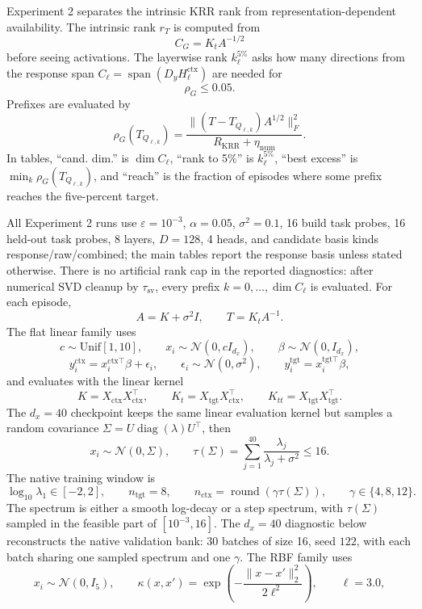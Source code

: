 \documentclass[11pt]{article}
\newcommand{\spanop}{\operatorname{span}}
\begin{document}
Experiment 2 separates the intrinsic KRR rank from representation-dependent availability. The
intrinsic rank \(r_T\) is computed from
\[
C_G=K_tA^{-1/2}
\]
before seeing activations. The layerwise rank \(k_\ell^{5\%}\) asks how many directions from the
response span \(C_\ell=\spanop(D_yH_\ell^{\mathrm{ctx}})\) are needed for
\[
\rho_G\le0.05.
\]
Prefixes are evaluated by
\[
\rho_G(T_{Q_{\ell,k}})
=
\frac{\|(T-T_{Q_{\ell,k}})A^{1/2}\|_F^2}{R_{\mathrm{KRR}}+\eta_{\mathrm{num}}}.
\]
In tables, ``cand. dim.'' is \(\dim C_\ell\), ``rank to 5\%'' is \(k_\ell^{5\%}\), ``best
excess'' is \(\min_k\rho_G(T_{Q_{\ell,k}})\), and ``reach'' is the fraction of episodes where some
prefix reaches the five-percent target.

All Experiment 2 runs use \(\varepsilon=10^{-3}\), \(\alpha=0.05\), \(\sigma^2=0.1\),
16 build task probes, 16 held-out task probes, 8 layers, \(D=128\), 4 heads, and candidate basis
kinds response/raw/combined; the main tables report the response basis unless stated otherwise.
There is no artificial rank cap in the reported diagnostics: after numerical SVD cleanup by
\(\tau_{\mathrm{sv}}\), every prefix \(k=0,\ldots,\dim C_\ell\) is evaluated.
For each episode,
\[
A=K+\sigma^2 I,\qquad T=K_tA^{-1}.
\]
The flat linear family uses
\[
c\sim\mathrm{Unif}[1,10],
\qquad
x_i\sim\mathcal{N}(0,cI_{d_x}),
\qquad
\beta\sim\mathcal{N}(0,I_{d_x}),
\]
\[
y_i^{\mathrm{ctx}}=x_i^{\mathrm{ctx}\top}\beta+\epsilon_i,
\qquad
\epsilon_i\sim\mathcal{N}(0,\sigma^2),
\qquad
y_i^{\mathrm{tgt}}=x_i^{\mathrm{tgt}\top}\beta,
\]
and evaluates with the linear kernel
\[
K=X_{\mathrm{ctx}}X_{\mathrm{ctx}}^\top,
\qquad
K_t=X_{\mathrm{tgt}}X_{\mathrm{ctx}}^\top,
\qquad
K_{tt}=X_{\mathrm{tgt}}X_{\mathrm{tgt}}^\top .
\]
The \(d_x=40\) checkpoint keeps the same linear evaluation kernel but samples a random covariance
\(\Sigma=U\operatorname{diag}(\lambda)U^\top\), then
\[
x_i\sim\mathcal{N}(0,\Sigma),
\qquad
\tau(\Sigma)=\sum_{j=1}^{40}\frac{\lambda_j}{\lambda_j+\sigma^2}\le16.
\]
The native training window is
\[
\log_{10}\lambda_1\in[-2,2],
\qquad
n_{\mathrm{tgt}}=8,\qquad
n_{\mathrm{ctx}}=\operatorname{round}(\gamma\tau(\Sigma)),
\qquad
\gamma\in\{4,8,12\}.
\]
The spectrum is either a smooth log-decay or a step spectrum, with \(\tau(\Sigma)\) sampled in the
feasible part of \([10^{-3},16]\). The \(d_x=40\) diagnostic below reconstructs the native
validation bank: 30 batches of size 16, seed \(122\), with each batch sharing one sampled spectrum
and one \(\gamma\). The RBF family uses
\[
x_i\sim\mathcal{N}(0,I_5),
\qquad
\kappa(x,x')=\exp\!\left(-\frac{\|x-x'\|_2^2}{2\ell^2}\right),
\qquad
\ell=3.0,
\]
\end{document}
